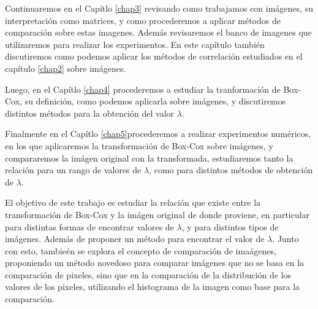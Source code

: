 Continuaremos en el Cap\'itlo \ref{chap3} revisando como trabajamos con im\'agenes, su interpretaci\'on como matrices, y como procederemos a aplicar m\'etodos de comparaci\'on sobre estas imagenes. Adem\'as revisaremos el banco de imagenes que utilizaremos para realizar los experimentos. En este cap\'itulo tambi\'en discutiremos como podemos aplicar los m\'etodos de correlaci\'on estudiados en el cap\'itulo \ref{chap2} sobre im\'agenes.

Luego, en el Cap\'itlo \ref{chap4} procederemos a estudiar la tranformaci\'on de Box-Cox, su definici\'on, como podemos aplicarla sobre im\'agenes, y discutiremos distintos m\'etodos para la obtenci\'on del valor $\lambda$. 

Finalmente en el Cap\'itlo \ref{chap5}procederemos a realizar experimentos num\'ericos, en los que aplicaremos la transformaci\'on de Box-Cox sobre im\'agenes, y compararemos la im\'agen original con la transformada, estudiaremos tanto la relaci\'on para un rango de valores de $\lambda$, como para distintos m\'etodos de obtenci\'on de $\lambda$.

El objetivo de este trabajo es estudiar la relaci\'on que existe entre la transformaci\'on de Box-Cox y la im\'agen original de donde proviene, en particular para distintas formas de encontrar valores de $\lambda$, y para distintos tipos de im\'agenes. Adem\'as de proponer un m\'etodo para encontrar el valor de $\lambda$. Junto con esto, tambie\'en se explora el concepto de comparaci\'on de ima\'agenes, proponiendo un m\'etodo novedoso para comparar im\'agenes que no se basa en la comparaci\'on de pixeles, sino que en la comparaci\'on de la distribuci\'on de los valores de los pixeles, utilizando el histograma de la imagen como base para la comparaci\'on.